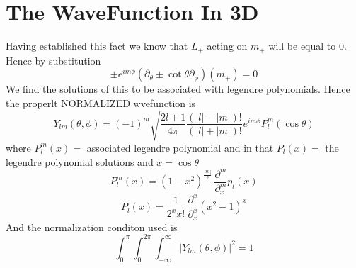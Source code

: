 \documentclass{article}
\begin{document}
\section{The WaveFunction In 3D}
Having established this fact we know that $L_+$ acting on $m_+$ will be equal to $0$. Hence by substitution 
\begin{equation}
{\pm}e^{im\phi}(\partial_\theta \pm \cot{\theta}\partial_{\phi})(m_+)=0
\end{equation}
We find the solutions of this to be associated with legendre polynomials. Hence the properlt NORMALIZED wvefunction is 
\begin{equation}
Y_{lm}(\theta,\phi)=(-1)^m \sqrt{\frac{2l+1}{4\pi} \frac{(|l|-|m|)!}{(|l|+|m|)!}}e^{im\phi}P_l^m(\cos{\theta}) 
\end{equation}
where $P_l^m(x)=$ associated legendre polynomial and in that $P_l(x)=$ the legendre polynomial solutions and $x=\cos{\theta}$
\begin{equation}
P_l^m(x)=(1-x^2)^{\frac{|m|}{2}}\,\frac{\partial^m}{\partial_x^m}p_l(x) 
\end{equation}
\begin{equation}
P_l(x)=\frac{1}{2^x x!}\, \frac{\partial^x}{\partial_x^x}(x^2-1)^x
\end{equation}
And the normalization conditon used is 
\begin{equation}
\int_{0}^{\pi}\int_{0}^{2\pi}\int_{-\infty}^{\infty}{|Y_{lm}(\theta,\phi)|^2}= 1
\end{equation}
\end{document}
